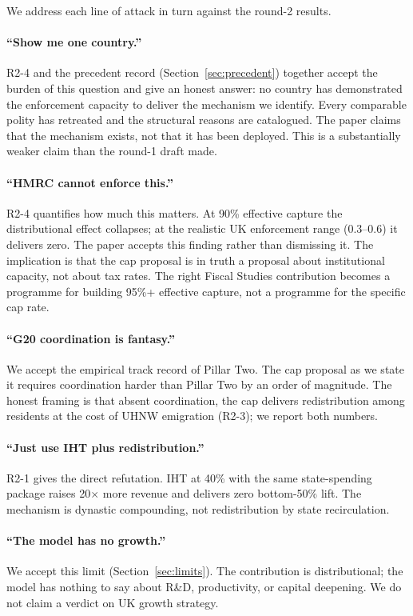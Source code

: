\documentclass[11pt]{article}
\begin{document}
We address each line of attack in turn against the round-2 results.

\paragraph{``Show me one country.''}  R2-4 and the precedent
record (Section~\ref{sec:precedent}) together accept the burden of
this question and give an honest answer: no country has demonstrated
the enforcement capacity to deliver the mechanism we identify.
Every comparable polity has retreated and the structural reasons
are catalogued.  The paper claims that the mechanism exists, not
that it has been deployed.  This is a substantially weaker claim
than the round-1 draft made.

\paragraph{``HMRC cannot enforce this.''}  R2-4 quantifies how much
this matters.  At 90\% effective capture the distributional effect
collapses; at the realistic UK enforcement range (0.3--0.6) it
delivers zero.  The paper accepts this finding rather than
dismissing it.  The implication is that the cap proposal is in
truth a proposal about institutional capacity, not about tax
rates.  The right Fiscal Studies contribution becomes a programme
for building 95\%+ effective capture, not a programme for the
specific cap rate.

\paragraph{``G20 coordination is fantasy.''}  We accept the
empirical track record of Pillar Two.  The cap proposal as we
state it requires coordination harder than Pillar Two by an order
of magnitude.  The honest framing is that absent coordination, the
cap delivers redistribution among residents at the cost of UHNW
emigration (R2-3); we report both numbers.

\paragraph{``Just use IHT plus redistribution.''}  R2-1 gives the
direct refutation.  IHT at 40\% with the same state-spending
package raises 20$\times$ more revenue and delivers zero
bottom-50\% lift.  The mechanism is dynastic compounding, not
redistribution by state recirculation.

\paragraph{``The model has no growth.''}  We accept this limit
(Section~\ref{sec:limits}).  The contribution is distributional;
the model has nothing to say about R\&D, productivity, or
capital deepening.  We do not claim a verdict on UK growth
strategy.
\end{document}
